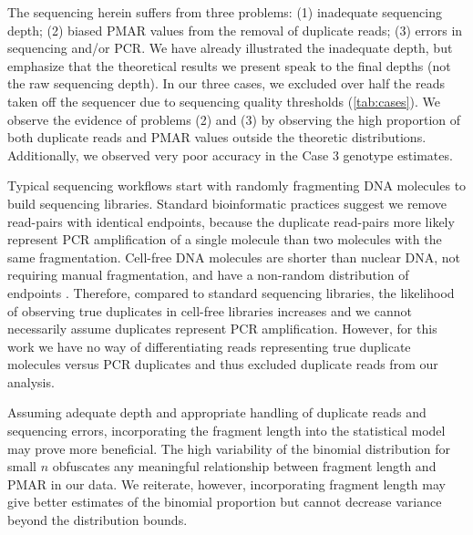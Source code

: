 \documentclass{article}\usepackage[]{graphicx}\usepackage[]{color}
\begin{document}

The sequencing herein suffers from three problems: (1) inadequate sequencing depth; (2) biased PMAR values from the removal of duplicate reads; (3) errors in sequencing and/or PCR.
We have already illustrated the inadequate depth, but emphasize that the theoretical results we present speak to the final depths (not the raw sequencing depth).
In our three cases, we excluded over half the reads taken off the sequencer due to sequencing quality thresholds (\cref{tab:cases}).
We observe the evidence of problems (2) and (3) by observing the high proportion of both duplicate reads and PMAR values outside the theoretic distributions.
Additionally, we observed very poor accuracy in the Case 3 genotype estimates.

Typical sequencing workflows start with randomly fragmenting DNA molecules to build sequencing libraries.
Standard bioinformatic practices suggest we remove read-pairs with identical endpoints, because the duplicate read-pairs more likely represent PCR amplification of a single molecule than two molecules with the same fragmentation.
Cell-free DNA molecules are shorter than nuclear DNA, not requiring manual fragmentation, and have a non-random distribution of endpoints \cite{chan:2016aa}.
Therefore, compared to standard sequencing libraries, the likelihood of observing true duplicates in cell-free libraries increases and we cannot necessarily assume duplicates represent PCR amplification.
However, for this work we have no way of differentiating reads representing true duplicate molecules versus PCR duplicates and thus excluded duplicate reads from our analysis.

Assuming adequate depth and appropriate handling of duplicate reads and sequencing errors, incorporating the fragment length into the statistical model may prove more beneficial.
The high variability of the binomial distribution for small $n$ obfuscates any meaningful relationship between fragment length and PMAR in our data.
We reiterate, however, incorporating fragment length may give better estimates of the binomial proportion but cannot decrease variance beyond the distribution bounds.
\end{document}
